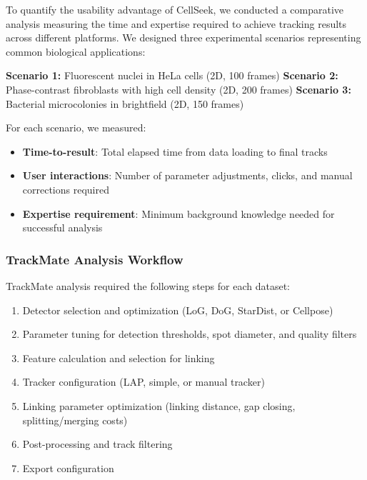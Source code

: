 \documentclass[12pt]{article}
\begin{document}

To quantify the usability advantage of CellSeek, we conducted a comparative analysis measuring the time and expertise required to achieve tracking results across different platforms. We designed three experimental scenarios representing common biological applications:

\textbf{Scenario 1:} Fluorescent nuclei in HeLa cells (2D, 100 frames)
\textbf{Scenario 2:} Phase-contrast fibroblasts with high cell density (2D, 200 frames)  
\textbf{Scenario 3:} Bacterial microcolonies in brightfield (2D, 150 frames)

For each scenario, we measured:
\begin{itemize}
\item \textbf{Time-to-result}: Total elapsed time from data loading to final tracks
\item \textbf{User interactions}: Number of parameter adjustments, clicks, and manual corrections required
\item \textbf{Expertise requirement}: Minimum background knowledge needed for successful analysis
\end{itemize}

\subsubsection{TrackMate Analysis Workflow}

TrackMate analysis required the following steps for each dataset:
\begin{enumerate}
\item Detector selection and optimization (LoG, DoG, StarDist, or Cellpose)
\item Parameter tuning for detection thresholds, spot diameter, and quality filters
\item Feature calculation and selection for linking
\item Tracker configuration (LAP, simple, or manual tracker)
\item Linking parameter optimization (linking distance, gap closing, splitting/merging costs)
\item Post-processing and track filtering
\item Export configuration
\end{enumerate}
\end{document}
